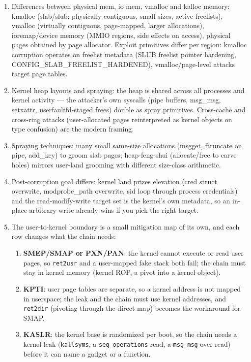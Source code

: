 \documentclass[12pt]{Training}
\begin{document}
\begin{enumerate}
    \item Differences between physical mem, io mem, vmalloc and kalloc memory: kmalloc (slab/slub: physically contiguous, small sizes, active freelists), vmalloc (virtually contiguous, page-mapped, larger allocations), ioremap/device memory (MMIO regions, side effects on access), physical pages obtained by page allocator. Exploit primitives differ per region: kmalloc corruption operates on freelist metadata (SLUB freelist pointer hardening, CONFIG\_SLAB\_FREELIST\_HARDENED), vmalloc/page-level attacks target page tables.
    \item Kernel heap layouts and spraying: the heap is shared across all processes and kernel activity --- the attacker's own syscalls (pipe buffers, msg\_msg, setxattr, userfaultfd-staged frees) double as spray primitives. Cross-cache and cross-ring attacks (user-allocated pages reinterpreted as kernel objects on type confusion) are the modern framing.
    \item Spraying techniques: many small same-size allocations (msgget, ftruncate on pipe, add\_key) to groom slab pages; heap-feng-shui (allocate/free to carve holes) mirrors user-land grooming with different size-class arithmetic.
    \item Post-corruption goal differs: kernel land prizes elevation (cred struct overwrite, modprobe\_path overwrite, sid loop through process credentials) and the read-modify-write target set is the kernel's own metadata, so an in-place arbitrary write already wins if you pick the right target.
    \item The user-to-kernel boundary is a small mitigation map of its own, and each row changes what the chain needs:
    \begin{enumerate}
        \item \textbf{SMEP/SMAP or PXN/PAN}: the kernel cannot execute or read user pages, so \lstinline{ret2usr} and a user-mapped fake stack both fail; the chain must stay in kernel memory (kernel ROP, a pivot into a kernel object).
        \item \textbf{KPTI}: user page tables are separate, so a kernel address is not mapped in userspace; the leak and the chain must use kernel addresses, and \lstinline{ret2dir} (pivoting through the direct map) becomes the workaround for SMAP.
        \item \textbf{KASLR}: the kernel base is randomized per boot, so the chain needs a kernel leak (\lstinline{kallsyms}, a \lstinline{seq_operations} read, a \lstinline{msg_msg} over-read) before it can name a gadget or a function.

\end{enumerate}
\end{enumerate}
\end{document}
